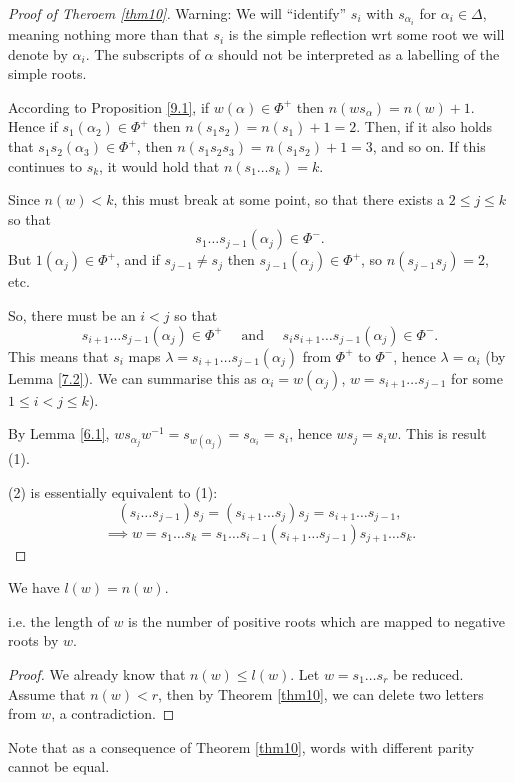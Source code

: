\begin{proof}[Proof of Theroem \ref{thm10}]
Warning: We will ``identify'' $s_i$ with $s_{\alpha_i}$ for $\alpha_i \in \Delta$,
meaning nothing more than that $s_i$ is the simple reflection wrt some root we
will denote by $\alpha_i$. The subscripts of $\alpha$ should not be interpreted
as a labelling of the simple roots.

According to Proposition \ref{9.1}, if $w(\alpha) \in \Phi^+$ then
$n(w s_\alpha) = n(w) + 1$. Hence if $s_1(\alpha_2) \in \Phi^+$ then
$n(s_1 s_2) = n(s_1) + 1 = 2$. Then, if it also holds that
$s_1 s_2 (\alpha_3) \in \Phi^+$, then $n(s_1 s_2 s_3) = n(s_1 s_2) + 1 = 3$,
and so on. If this continues to $s_k$, it would hold that $n(s_1 \dots s_k) = k$.

Since $n(w) < k$, this must break at some point, so that there exists a
$2 \leq j \leq k$ so that
\[
    s_1 \dots s_{j-1}(\alpha_j) \in \Phi^-.
\]
But $1(\alpha_j) \in \Phi^+$, and if $s_{j-1} \neq s_j$ then
$s_{j-1}(\alpha_j) \in \Phi^+$, so $n(s_{j-1} s_j) = 2$, etc.

So, there must be an $i < j$ so that
\[ s_{i+1} \dots s_{j-1}(\alpha_j) \in \Phi^+
\quad \text{ and } \quad
s_i s_{i+1} \dots s_{j-1}(\alpha_j) \in \Phi^-. \]
This means that $s_i$ maps $\lambda = s_{i+1} \dots s_{j-1}(\alpha_j)$ from
$\Phi^+$ to $\Phi^-$, hence $\lambda = \alpha_i$ (by Lemma \ref{7.2}). We can
summarise this as $\alpha_i = w(\alpha_j)$, $w = s_{i+1} \dots s_{j-1}$ for some
$1 \leq i < j \leq k$).

By Lemma \ref{6.1}, $w s_{\alpha_j} w^{-1} = s_{w(\alpha_j)} = s_{\alpha_i} =
s_i$, hence $w s_j = s_i w$. This is result (1).

(2) is essentially equivalent to (1):
\[
    (s_i \dots s_{j-1}) s_j = (s_{i+1} \dots s_j) s_j = s_{i+1} \dots s_{j-1},
\]
\[
    \implies
    w = s_1 \dots s_k = s_1 \dots s_{i-1} (s_{i+1} \dots s_{j-1}) s_{j+1} \dots s_k.
\]
\end{proof}

\begin{theorem} \label{thm11}
We have $l(w) = n(w)$.
\end{theorem}

i.e. the length of $w$ is the number of positive roots which are mapped to
negative roots by $w$.

\begin{proof}
We already know that $n(w) \leq l(w)$. Let $w = s_1 \dots s_r$ be reduced.
Assume that $n(w) < r$, then by Theorem \ref{thm10}, we can delete two letters
from $w$, a contradiction.
\end{proof}

Note that as a consequence of Theorem \ref{thm10}, words with different parity
cannot be equal.
